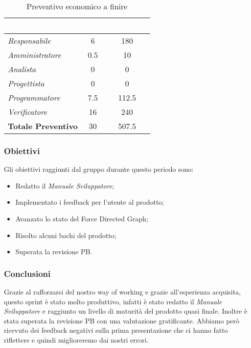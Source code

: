 \begin{table}[H]
    \renewcommand\arraystretch{1.5}
    \centering
    \begin{tabular}{|l|c|c|}
    \hline
    \rowcolor[HTML]{036400}
    \textcolor{white}{\textbf{Ruolo}} & \multicolumn{1}{l|}{\textcolor{white}{\textbf{Ore}}} & \multicolumn{1}{l|}{\textcolor{white}{\textbf{Costo (€)}}} \\ \hline
    \rowcolor[HTML]{EFEFEF}\textit{Responsabile}      & 6            & 180               \\ \hline
    \rowcolor[HTML]{C0C0C0}\textit{Amministratore}    & 0.5          & 10                \\ \hline
    \rowcolor[HTML]{EFEFEF}\textit{Analista}          & 0            & 0                 \\ \hline
    \rowcolor[HTML]{C0C0C0}\textit{Progettista}       & 0            & 0                \\ \hline
    \rowcolor[HTML]{EFEFEF}\textit{Programmatore}     & 7.5          & 112.5               \\ \hline
    \rowcolor[HTML]{C0C0C0}\textit{Verificatore}      & 16           & 240             \\ \hline
    \rowcolor[HTML]{EFEFEF}\textbf{Totale Preventivo} & 30          & 507.5            \\ \hline
    \end{tabular}
    \caption{Preventivo economico a finire}
\end{table}

\subsubsection{Obiettivi}
Gli obiettivi raggiunti dal gruppo durante questo periodo sono:
\begin{itemize}
    \item Redatto il \textit{Manuale Sviluppatore};
    \item Implementato i feedback per l'utente al prodotto;
    \item Avanzato lo stato del Force Directed Graph;
    \item Risolto alcuni bachi del prodotto;
    \item Superata la revisione PB.
\end{itemize}

\subsubsection{Conclusioni}
Grazie al rafforzarsi del nostro way of working e grazie all'esperienza acquisita, questo sprint è stato molto produttivo, infatti è stato redatto il \textit{Manuale Sviluppatore} e raggiunto un livello di maturità del prodotto quasi finale. Inoltre è stata superata la revisione PB con una valutazione gratificante. Abbiamo però ricevuto dei feedback negativi sulla prima presentazione che ci hanno fatto riflettere e quindi miglioreremo dai nostri errori.

